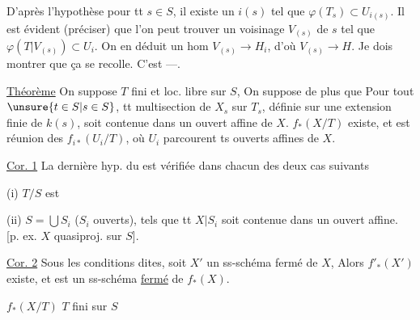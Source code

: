 D'après l'hypothèse  pour tt $s\in S$, il existe un $i(s)$ tel que $\varphi(T_s)\subset U_{i(s)}$. Il est évident (préciser) que l'on peut trouver un voisinage $V_{(s)}$ de $s$ tel que $\varphi(T\vert V_{(s)})\subset U_i$. On en déduit un hom $V_{(s)}\longrightarrow H_i$, d'où $V_{(s)}\longrightarrow H$.
Je dois montrer que ça se recolle. C'est  ---.

\uline{Théorème} On suppose $T$ fini et loc. libre sur $S$,
On suppose de plus que  
Pour tout $\unsure{t\in S|s\in S}$, tt multisection de $X_s$ sur $T_s$, définie sur une extension finie de $k(s)$, soit contenue dans un ouvert affine de $X$.
\deleted{[\unsure{condition Hyp.}}  
$f_*(X/T)$ existe, et est réunion des $f_{i*}(U_i/T)$, où $U_i$ parcourent ts ouverts affines de $X$.

\uline{Cor. 1} La dernière hyp. du  est vérifiée dans chacun des deux cas suivants

(i) $T/S$ est 

(ii) $S=\bigcup S_i$ ($S_i$ ouverts), tels que tt  $X\vert S_i$ soit contenue dans un ouvert affine.
[p. ex. $X$ quasiproj. sur $S$].

\uline{Cor. 2} Sous les conditions dites, soit $X'$ un ss-schéma fermé de $X$,  Alors $f'_*(X')$ existe, et est un ss-schéma \uline{fermé} de $f_*(X)$.

$f_*(X/T)$ \qquad $T$ fini sur $S$

